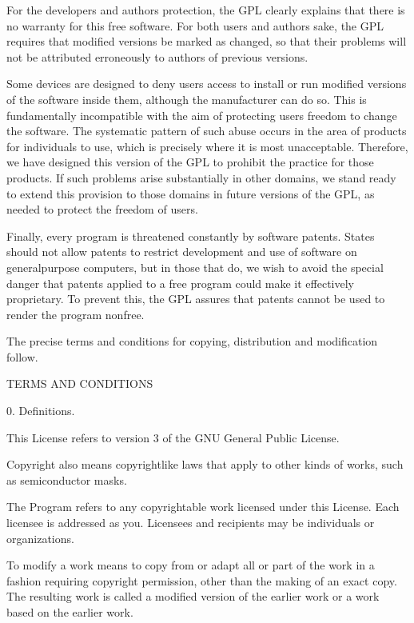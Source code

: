 \documentclass[letterpaper,10pt,english]{sphinxmanual}
\begin{document}
\begin{sphinxVerbatim}[commandchars=\\\{\}]
  For the developers\PYGZsq{} and authors\PYGZsq{} protection, the GPL clearly explains
that there is no warranty for this free software.  For both users\PYGZsq{} and
authors\PYGZsq{} sake, the GPL requires that modified versions be marked as
changed, so that their problems will not be attributed erroneously to
authors of previous versions.

  Some devices are designed to deny users access to install or run
modified versions of the software inside them, although the manufacturer
can do so.  This is fundamentally incompatible with the aim of
protecting users\PYGZsq{} freedom to change the software.  The systematic
pattern of such abuse occurs in the area of products for individuals to
use, which is precisely where it is most unacceptable.  Therefore, we
have designed this version of the GPL to prohibit the practice for those
products.  If such problems arise substantially in other domains, we
stand ready to extend this provision to those domains in future versions
of the GPL, as needed to protect the freedom of users.

  Finally, every program is threatened constantly by software patents.
States should not allow patents to restrict development and use of
software on general\PYGZhy{}purpose computers, but in those that do, we wish to
avoid the special danger that patents applied to a free program could
make it effectively proprietary.  To prevent this, the GPL assures that
patents cannot be used to render the program non\PYGZhy{}free.

  The precise terms and conditions for copying, distribution and
modification follow.

                       TERMS AND CONDITIONS

  0. Definitions.

  \PYGZdq{}This License\PYGZdq{} refers to version 3 of the GNU General Public License.

  \PYGZdq{}Copyright\PYGZdq{} also means copyright\PYGZhy{}like laws that apply to other kinds of
works, such as semiconductor masks.

  \PYGZdq{}The Program\PYGZdq{} refers to any copyrightable work licensed under this
License.  Each licensee is addressed as \PYGZdq{}you\PYGZdq{}.  \PYGZdq{}Licensees\PYGZdq{} and
\PYGZdq{}recipients\PYGZdq{} may be individuals or organizations.

  To \PYGZdq{}modify\PYGZdq{} a work means to copy from or adapt all or part of the work
in a fashion requiring copyright permission, other than the making of an
exact copy.  The resulting work is called a \PYGZdq{}modified version\PYGZdq{} of the
earlier work or a work \PYGZdq{}based on\PYGZdq{} the earlier work.


\end{sphinxVerbatim}
\end{document}
